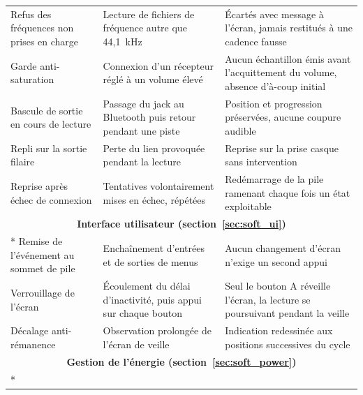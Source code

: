 \begin{longtable}{p{} p{} p{}}
    \hline
    Refus des fréquences non prises en charge & Lecture de fichiers de fréquence autre que 44,1~kHz                                              & Écartés avec message à l'écran, jamais restitués à une cadence fausse                      \\
    Garde anti-saturation                     & Connexion d'un récepteur réglé à un volume élevé                                                 & Aucun échantillon émis avant l'acquittement du volume, absence d'à-coup initial            \\
    Bascule de sortie en cours de lecture     & Passage du jack au Bluetooth puis retour pendant une piste                                       & Position et progression préservées, aucune coupure audible                                 \\
    Repli sur la sortie filaire               & Perte du lien provoquée pendant la lecture                                                       & Reprise sur la prise casque sans intervention                                              \\
    Reprise après échec de connexion          & Tentatives volontairement mises en échec, répétées                                               & Redémarrage de la pile ramenant chaque fois un état exploitable                            \\
    \hline
    \multicolumn{3}{c}{\textbf{Interface utilisateur (section~\ref{sec:soft_ui})}}                                                                                                                                                            \\*
    \hline
    Remise de l'événement au sommet de pile   & Enchaînement d'entrées et de sorties de menus                                                    & Aucun changement d'écran n'exige un second appui                                           \\
    Verrouillage de l'écran                   & Écoulement du délai d'inactivité, puis appui sur chaque bouton                                   & Seul le bouton A réveille l'écran, la lecture se poursuivant pendant la veille             \\
    Décalage anti-rémanence                   & Observation prolongée de l'écran de veille                                                       & Indication redessinée aux positions successives du cycle                                   \\
    \hline
    \multicolumn{3}{c}{\textbf{Gestion de l'énergie (section~\ref{sec:soft_power})}}                                                                                                                                                          \\*

\end{longtable}

